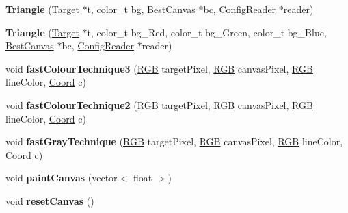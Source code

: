 \begin{DoxyCompactItemize}
\item 
\hypertarget{class_triangle_ac67314c05a3d2d68cf214a72fd8a4655}{{\bfseries Triangle} (\hyperlink{class_target}{Target} $\ast$t, color\-\_\-t bg, \hyperlink{class_best_canvas}{Best\-Canvas} $\ast$bc, \hyperlink{class_config_reader}{Config\-Reader} $\ast$reader)}\label{class_triangle_ac67314c05a3d2d68cf214a72fd8a4655}

\item 
\hypertarget{class_triangle_a31d753323059f2811f7a12aced9edac6}{{\bfseries Triangle} (\hyperlink{class_target}{Target} $\ast$t, color\-\_\-t bg\-\_\-\-Red, color\-\_\-t bg\-\_\-\-Green, color\-\_\-t bg\-\_\-\-Blue, \hyperlink{class_best_canvas}{Best\-Canvas} $\ast$bc, \hyperlink{class_config_reader}{Config\-Reader} $\ast$reader)}\label{class_triangle_a31d753323059f2811f7a12aced9edac6}

\item 
\hypertarget{class_triangle_aba39e11f159609a9dfe8ea9fd6ad5730}{void {\bfseries fast\-Colour\-Technique3} (\hyperlink{struct_r_g_b}{R\-G\-B} target\-Pixel, \hyperlink{struct_r_g_b}{R\-G\-B} canvas\-Pixel, \hyperlink{struct_r_g_b}{R\-G\-B} line\-Color, \hyperlink{struct_coord}{Coord} c)}\label{class_triangle_aba39e11f159609a9dfe8ea9fd6ad5730}

\item 
\hypertarget{class_triangle_a5c5309941f344226f0cb97b5ce66fea9}{void {\bfseries fast\-Colour\-Technique2} (\hyperlink{struct_r_g_b}{R\-G\-B} target\-Pixel, \hyperlink{struct_r_g_b}{R\-G\-B} canvas\-Pixel, \hyperlink{struct_r_g_b}{R\-G\-B} line\-Color, \hyperlink{struct_coord}{Coord} c)}\label{class_triangle_a5c5309941f344226f0cb97b5ce66fea9}

\item 
\hypertarget{class_triangle_af7f44228dc2af65b97affb10c386d85f}{void {\bfseries fast\-Gray\-Technique} (\hyperlink{struct_r_g_b}{R\-G\-B} target\-Pixel, \hyperlink{struct_r_g_b}{R\-G\-B} canvas\-Pixel, \hyperlink{struct_r_g_b}{R\-G\-B} line\-Color, \hyperlink{struct_coord}{Coord} c)}\label{class_triangle_af7f44228dc2af65b97affb10c386d85f}

\item 
\hypertarget{class_triangle_a0f32ca2cdce8d21ada6fd5c5132f9e4a}{void {\bfseries paint\-Canvas} (vector$<$ float $>$)}\label{class_triangle_a0f32ca2cdce8d21ada6fd5c5132f9e4a}

\item 
\hypertarget{class_triangle_a1471eda3739a1f39be9fe59bd93edf96}{void {\bfseries reset\-Canvas} ()}\label{class_triangle_a1471eda3739a1f39be9fe59bd93edf96}


\end{DoxyCompactItemize}
